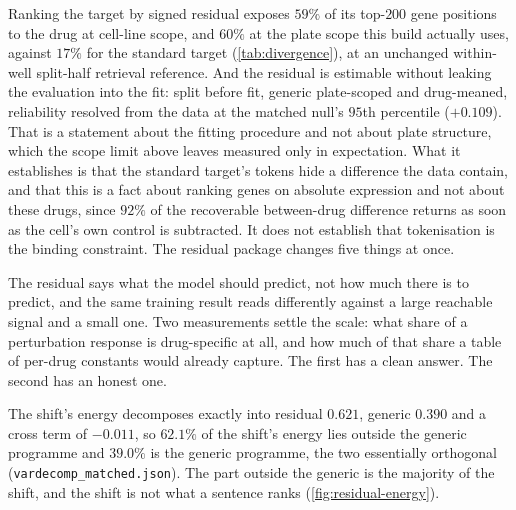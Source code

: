 

%
\begin{claim}
Ranking the target by signed residual exposes $59\%$ of its top-$200$ gene
positions to the drug at cell-line scope, and $60\%$ at the plate scope this
build actually uses, against $17\%$ for the standard target
(\cref{tab:divergence}), at an unchanged within-well split-half retrieval
reference. And the residual is estimable without leaking the evaluation into the
fit: split before fit, generic plate-scoped and drug-meaned, reliability resolved
from the data at the matched null's $95$th percentile ($+0.109$). That is a
statement about the fitting procedure and not about plate structure, which the
scope limit above leaves measured only in expectation. What it establishes is
that the standard target's tokens hide a difference the data contain, and that
this is a fact about ranking genes on absolute expression and not about these
drugs, since $92\%$ of the recoverable between-drug difference returns as soon as
the cell's own control is subtracted. It does not establish that tokenisation is
the binding constraint. The residual package changes five things at once.
\end{claim}

\label{sec:methods-vardecomp}

\begin{question}[5]
The residual says what the model should predict, not how much there is to
predict, and the same training result reads differently against a large reachable
signal and a small one. Two measurements settle the scale: what share of a
perturbation response is drug-specific at all, and how much of that share a table
of per-drug constants would already capture. The first has a clean answer. The
second has an honest one.
\end{question}

\noindent
The shift's energy decomposes exactly into residual $0.621$, generic $0.390$ and
a cross term of $-0.011$, so $62.1\%$ of the shift's energy lies outside the
generic programme and $39.0\%$ is the generic programme, the two essentially
orthogonal (\texttt{vardecomp\_matched.json}). The part outside the generic is
the majority of the shift, and the shift is not what a sentence ranks
(\cref{fig:residual-energy}).

